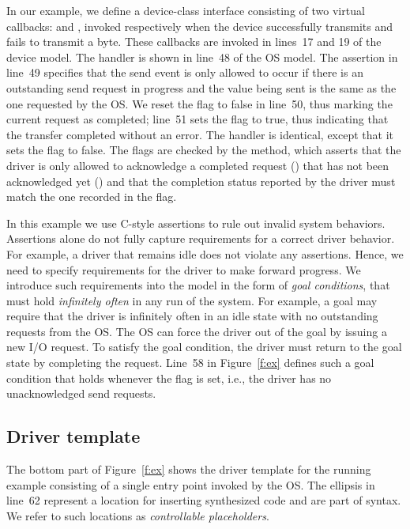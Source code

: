 In our example, we define a device-class interface consisting of two virtual callbacks:  and , invoked respectively when the device successfully transmits and fails to transmit a byte.  These callbacks are invoked in lines~17 and 19 of the device model.  The  handler is shown in line~48 of the OS model.  The assertion in line~49 specifies that the send event is only allowed to occur if there is an outstanding send request in progress and the value being sent is the same as the one requested by the OS.  We reset the  flag to false in line~50, thus marking the current request as completed; line~51 sets the  flag to true, thus indicating that the transfer completed without an error.  The  handler is identical, except that it sets the  flag to false.  The flags are checked by the  method, which asserts that the driver is only allowed to acknowledge a completed request () that has not been acknowledged yet () and that the completion status reported by the driver must match the one recorded in the  flag.

In this example we use C-style assertions to rule out invalid system behaviors.  Assertions alone do not fully capture requirements for a correct driver behavior.  For example, a driver that remains idle does not violate any assertions.  Hence, we need to specify requirements for the driver to make forward progress.  We introduce such requirements into the model in the form of \emph{goal conditions}, that must hold \emph{infinitely often} in any run of the system.  For example, a goal may require that the driver is infinitely often in an idle state with no outstanding requests from the OS.  The OS can force the driver out of the goal by issuing a new I/O request.  To satisfy the goal condition, the driver must return to the goal state by completing the request.  Line~58 in Figure~\ref{f:ex} defines such a goal condition that holds whenever the  flag is set, i.e., the driver has no unacknowledged send requests.

\subsection{Driver template}

The bottom part of Figure~\ref{f:ex} shows the driver template for the running example consisting of a single  entry point invoked by the OS.  The ellipsis in line~62 represent a location for inserting synthesized code and are part of \tsl syntax.  We refer to such locations as \emph{controllable placeholders}. 

